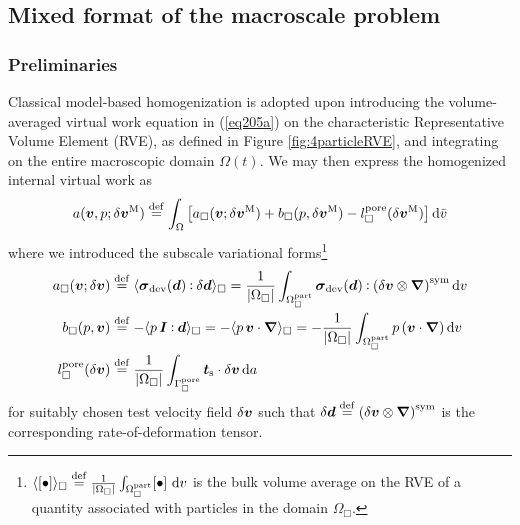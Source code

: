 \documentclass[10pt,a4paper]{article}
\newcommand{\fluid}{\mathrm{part}}
\newcommand{\pore}{\mathrm{pore}}
\newcommand{\surf}{\mathrm{s}}
\begin{document}
\subsection{Mixed format of the macroscale problem}

\subsubsection{Preliminaries}

Classical model-based homogenization is adopted upon introducing the volume-averaged virtual work equation in (\ref{eq205a}) on the characteristic Representative Volume Element (RVE), as defined in Figure \ref{fig:4particleRVE}, and integrating on the entire macroscopic domain $\Omega(t)$. We may then express the homogenized internal virtual work as
\begin{equation}
    a(\ta{v},p; \delta \ta{v}^\macro) \defeq
    \int_{\Omega} \left[
    a_\Box(\ta{v};\delta \ta{v}^\macro) + b_\Box(p, \delta \ta{v}^\macro) - l_\Box^\pore(\delta \ta{v}^\macro)
    \right] \dif \bar{v}
\label{eq402a}
\end{equation}
where we introduced the subscale variational forms\footnote{$\langle[\bullet]\rangle_\Box\defeq\frac{1}{|\Omega_\Box|}\int_{\Omega^\fluid_\Box}[\bullet] \, \dif v$ is the bulk volume average on the RVE of a quantity associated with particles in the domain $\Omega_\Box$.}
\begin{align}
    a_\Box(\ta{v};\delta \ta{v})
    & \defeq
    \langle \ts{\sigma}_\dev(\ts{d}) \dprod \delta \ts{d} \rangle_\Box =
    \frac{1}{|\Omega_\Box|}\int_{\Omega^\fluid_\Box} \ts{\sigma}_\dev(\ts{d}) \dprod \left(\delta \ta{v}\outerp\diff\right)^\sym \dif v
\label{eq403a}
\\
    b_\Box(p, \ta{v})
    & \defeq
    - \langle p\,\ts{I}\dprod\ts{d} \rangle_\Box =
    - \langle p\,\ta{v}\cdot\diff \rangle_\Box =
    - \frac{1}{|\Omega_\Box|}\int_{\Omega^\fluid_\Box} p \left(\ta{v}\cdot\diff\right) \dif v
\label{eq403b}
\\
    l_\Box^\pore(\delta \ta{v})
    & \defeq
    \frac{1}{|\Omega_\Box|} \int_{\Gamma_\Box^\pore} \ta{t}_\surf \cdot \delta\ta{v} \dif a
\label{eq403c}
\end{align}
for suitably chosen test velocity field $\delta\boldsymbol{v}$ such that $\delta\boldsymbol{d}\overset{\mathrm{def}}{=}\left(\delta\boldsymbol{v}\mathbin{\otimes}\boldsymbol{\nabla}\right)^{\mathrm{sym}}$ is the corresponding rate-of-deformation tensor.
\end{document}
